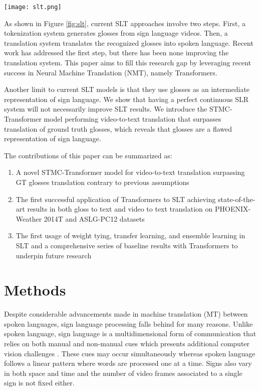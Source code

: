 \documentclass[11pt]{article}
\begin{document}
\begin{center}
\center
    \texttt{[image: slt.png]}
    \label{fig:slt}
\end{center}  

As shown in Figure \ref{fig:slt}, current SLT approaches involve two steps. First, a tokenization system generates glosses from sign language videos. Then, a translation system translates the recognized glosses into spoken language. Recent work \cite{Orbay2020NeuralSL,stmc} has addressed the first step, but there has been none improving the translation system. This paper aims to fill this research gap by leveraging recent success in Neural Machine Translation (NMT), namely Transformers. 

Another limit to current SLT models is that they use glosses as an intermediate representation of sign language. We show that having a perfect continuous SLR system will not necessarily improve SLT results. We introduce the STMC-Transformer model performing video-to-text translation that surpasses translation of ground truth glosses, which reveals that glosses are a flawed representation of sign language.

The contributions of this paper can be summarized as:
\begin{enumerate}
  \item A novel STMC-Transformer model for video-to-text translation surpassing GT glosses translation contrary to previous assumptions
  \item The first successful application of Transformers to SLT achieving state-of-the-art results in both gloss to text and video to text translation on PHOENIX-Weather 2014T and ASLG-PC12 datasets
  \item The first usage of weight tying, transfer learning, and ensemble learning in SLT and a comprehensive series of baseline results with Transformers to underpin future research

\end{enumerate}

\section{Methods}
Despite considerable advancements made in machine translation (MT) between spoken languages, sign language processing falls behind for many reasons. Unlike spoken language, sign language is a multidimensional form of communication that relies on both manual and non-manual cues which presents additional computer vision challenges \cite{nonmanual}. These cues may occur simultaneously whereas spoken language follows a linear pattern where words are processed one at a time. Signs also vary in both space and time and the number of video frames associated to a single sign is not fixed either.
\end{document}
